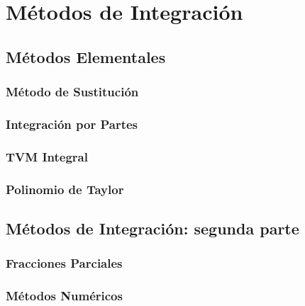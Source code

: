 \part{Métodos de Integración} %
\label{prt:métodos_ _de_ _integración_}
	\chapter{Métodos Elementales} %
	\label{cha:métodos_elementales}
		\section{Método de Sustitución} %
		\label{sec:método_de_sustitución}
			
		\section{Integración por Partes} %
		\label{sec:integración_por_partes}
			
		\section{TVM Integral} %
		\label{sec:tvm_integral}
			
		\section{Polinomio de Taylor} %
		\label{sec:polinomio_de_taylor}
			
	\chapter{Métodos de Integración: segunda parte} %
	\label{cha:métodos_de_integración_segunda_parte}
		\section{Fracciones Parciales} %
		\label{sec:fracciones_parciales}
			
		\section{Métodos Numéricos} %
		\label{sec:métodos_numéricos}
			
